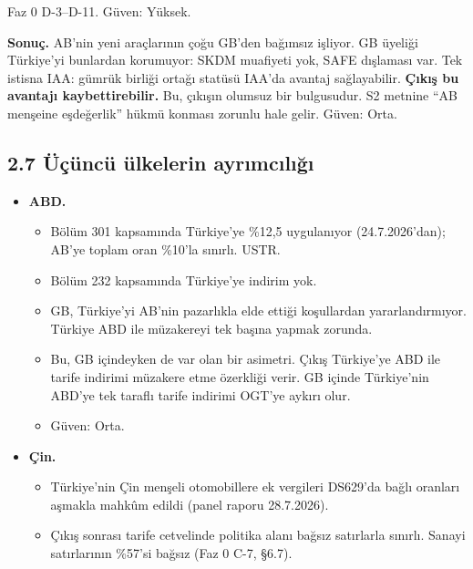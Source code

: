 \endgroup

\etiketV{} Faz 0 D-3--D-11. Güven: Yüksek.

\textbf{Sonuç.} AB'nin yeni araçlarının çoğu GB'den bağımsız işliyor. GB üyeliği Türkiye'yi bunlardan korumuyor: SKDM muafiyeti yok, SAFE dışlaması var. Tek istisna IAA: gümrük birliği ortağı statüsü IAA'da avantaj sağlayabilir. \textbf{Çıkış bu avantajı kaybettirebilir.} Bu, çıkışın olumsuz bir bulgusudur. S2 metnine ``AB menşeine eşdeğerlik'' hükmü konması zorunlu hale gelir. \etiketH{} Güven: Orta.

\hypertarget{01_teshis-27-uxfcuxe7uxfcncuxfc-uxfclkelerin-ayrux131mcux131lux131ux11fux131}{%
\subsection{2.7 Üçüncü ülkelerin ayrımcılığı}\label{01_teshis-27-uxfcuxe7uxfcncuxfc-uxfclkelerin-ayrux131mcux131lux131ux11fux131}}

\begin{itemize}
\tightlist
\item
  \textbf{ABD.}

  \begin{itemize}
  \tightlist
  \item
    Bölüm 301 kapsamında Türkiye'ye \%12,5 uygulanıyor (24.7.2026'dan); AB'ye toplam oran \%10'la sınırlı. \etiketV{} USTR.
  \item
    Bölüm 232 kapsamında Türkiye'ye indirim yok.
  \item
    GB, Türkiye'yi AB'nin pazarlıkla elde ettiği koşullardan yararlandırmıyor. Türkiye ABD ile müzakereyi tek başına yapmak zorunda.
  \item
    Bu, GB içindeyken de var olan bir asimetri. Çıkış Türkiye'ye ABD ile tarife indirimi müzakere etme özerkliği verir. GB içinde Türkiye'nin ABD'ye tek taraflı tarife indirimi OGT'ye aykırı olur.
  \item
    \etiketH{} Güven: Orta.
  \end{itemize}
\item
  \textbf{Çin.}

  \begin{itemize}
  \tightlist
  \item
    Türkiye'nin Çin menşeli otomobillere ek vergileri DS629'da bağlı oranları aşmakla mahkûm edildi (panel raporu 28.7.2026). \etiketV{}
  \item
    Çıkış sonrası tarife cetvelinde politika alanı bağsız satırlarla sınırlı. Sanayi satırlarının \%57'si bağsız (Faz 0 C-7, §6.7).
  \end{itemize}
\end{itemize}

